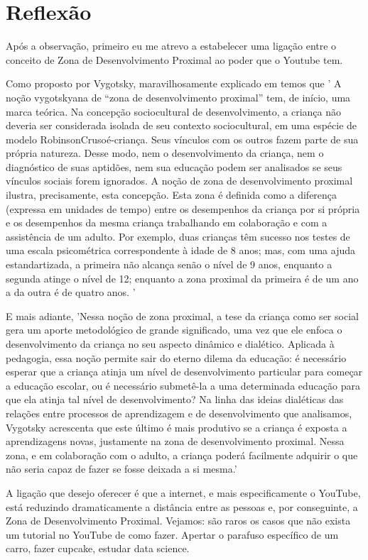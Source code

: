 \section{Reflexão}

Após a observação, primeiro eu me atrevo a estabelecer uma ligação entre o conceito de Zona de Desenvolvimento Proximal ao poder que o Youtube tem.

Como proposto por Vygotsky, maravilhosamente explicado em  temos que '
A noção vygotskyana de “zona de desenvolvimento proximal” tem, de início, uma marca teórica. Na concepção sociocultural de desenvolvimento, a criança não deveria ser considerada isolada de seu contexto sociocultural, em uma espécie de modelo RobinsonCrusoé-criança. Seus vínculos com os outros fazem parte de sua própria natureza. Desse modo, nem o desenvolvimento da criança, nem o diagnóstico de suas aptidões, nem sua educação podem ser analisados se seus vínculos sociais forem ignorados. A noção de zona de desenvolvimento proximal ilustra, precisamente, esta concepção. Esta zona é definida como a diferença (expressa em unidades de tempo) entre os desempenhos da criança por si própria e os desempenhos da mesma criança trabalhando em colaboração e com a assistência de um adulto. Por exemplo, duas crianças têm sucesso nos testes de uma escala psicométrica correspondente à idade de 8 anos; mas, com uma ajuda estandartizada, a primeira não alcança senão o nível de 9 anos, enquanto a segunda atinge o nível de 12; enquanto a zona proximal da primeira é de um ano a da outra é de quatro anos. '

E mais adiante, 'Nessa noção de zona proximal, a tese da criança como ser social gera um aporte metodológico de grande significado, uma vez que ele enfoca o desenvolvimento da criança no seu aspecto dinâmico e dialético. Aplicada à pedagogia, essa noção permite sair do eterno dilema da educação: é necessário esperar que a criança atinja um nível de desenvolvimento particular para começar a educação escolar, ou é necessário submetê-la a uma determinada educação para que ela atinja tal nível de desenvolvimento? Na linha das ideias dialéticas das relações entre processos de aprendizagem e de desenvolvimento que analisamos, Vygotsky acrescenta que este último é mais produtivo se a criança é exposta a aprendizagens novas, justamente na zona de desenvolvimento proximal. Nessa zona, e em colaboração com o adulto, a criança poderá facilmente adquirir o que não seria capaz de fazer se fosse deixada a si mesma.'

A ligação que desejo oferecer é que a internet, e mais especificamente o YouTube, está reduzindo dramaticamente a distância entre as pessoas e, por conseguinte, a Zona de Desenvolvimento Proximal. Vejamos: são raros os casos que não exista um tutorial no YouTube de como fazer. Apertar o parafuso específico de um carro, fazer cupcake, estudar data science.

